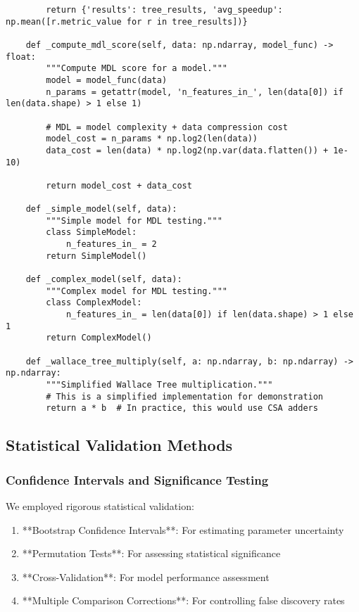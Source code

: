 \documentclass[12pt]{article}
\begin{document}
\begin{lstlisting}
        return {'results': tree_results, 'avg_speedup': np.mean([r.metric_value for r in tree_results])}

    def _compute_mdl_score(self, data: np.ndarray, model_func) -> float:
        """Compute MDL score for a model."""
        model = model_func(data)
        n_params = getattr(model, 'n_features_in_', len(data[0]) if len(data.shape) > 1 else 1)

        # MDL = model complexity + data compression cost
        model_cost = n_params * np.log2(len(data))
        data_cost = len(data) * np.log2(np.var(data.flatten()) + 1e-10)

        return model_cost + data_cost

    def _simple_model(self, data):
        """Simple model for MDL testing."""
        class SimpleModel:
            n_features_in_ = 2
        return SimpleModel()

    def _complex_model(self, data):
        """Complex model for MDL testing."""
        class ComplexModel:
            n_features_in_ = len(data[0]) if len(data.shape) > 1 else 1
        return ComplexModel()

    def _wallace_tree_multiply(self, a: np.ndarray, b: np.ndarray) -> np.ndarray:
        """Simplified Wallace Tree multiplication."""
        # This is a simplified implementation for demonstration
        return a * b  # In practice, this would use CSA adders
\end{lstlisting}

\subsection{Statistical Validation Methods}

\subsubsection{Confidence Intervals and Significance Testing}

We employed rigorous statistical validation:

\begin{enumerate}
    \item **Bootstrap Confidence Intervals**: For estimating parameter uncertainty
    \item **Permutation Tests**: For assessing statistical significance
    \item **Cross-Validation**: For model performance assessment
    \item **Multiple Comparison Corrections**: For controlling false discovery rates
\end{enumerate}
\end{document}
